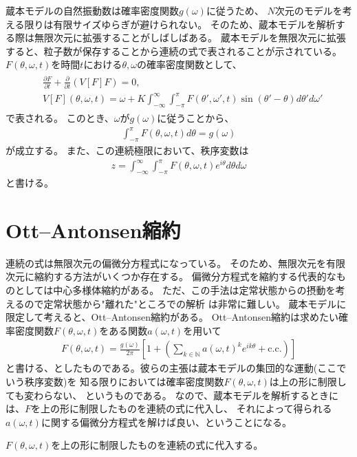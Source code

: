 \documentclass{jsarticle}
\begin{document}
蔵本モデルの自然振動数は確率密度関数$g(\omega)$に従うため、
$N$次元のモデルを考える限りは有限サイズゆらぎが避けられない。
そのため、蔵本モデルを解析する際は無限次元に拡張することがしばしばある。
蔵本モデルを無限次元に拡張すると、粒子数が保存することから連続の式で表されることが示されている。
$F(\theta,\omega,t)$を時間$t$における$\theta,\omega$の確率密度関数として、
\begin{align}
\begin{split}
&\frac{\partial F}{\partial t}+\frac{\partial}{\partial t}(V[F]F)=0,\\
&V[F](\theta,\omega,t)=\omega+K\int_{-\infty}^{\infty}\int_{-\pi}^{\pi} F(\theta',\omega',t)\sin(\theta'-\theta)d\theta'd\omega'
\end{split}
\end{align}
で表される。
このとき、$\omega$が$g(\omega)$に従うことから、
\begin{align}
\int_{-\pi}^{\pi}F(\theta,\omega,t)d\theta=g(\omega)
\end{align}
が成立する。
また、この連続極限において、秩序変数は
\begin{align}
z=\int_{-\infty}^{\infty}\int_{-\pi}^{\pi} F(\theta,\omega,t)e^{i\theta}d\theta d\omega
\end{align}
と書ける。

\section{Ott--Antonsen縮約}
連続の式は無限次元の偏微分方程式になっている。
そのため、無限次元を有限次元に縮約する方法がいくつか存在する。
偏微分方程式を縮約する代表的なものとしては中心多様体縮約がある。
ただ、この手法は定常状態からの摂動を考えるので定常状態から"離れた"ところでの解析
は非常に難しい。
蔵本モデルに限定して考えると、Ott--Antonsen縮約がある。
Ott--Antonsen縮約は求めたい確率密度関数$F(\theta,\omega,t)$をある関数$a(\omega,t)$を用いて
\begin{align}
F(\theta,\omega,t)=\frac{g(\omega)}{2\pi}\left[1+\left(\sum_{k\in\mathbb{N}}a(\omega,t)^{k}e^{ik\theta}+\mathrm{c.c.}\right)\right]
\end{align}
と書ける、としたものである。彼らの主張は蔵本モデルの集団的な運動(ここでいう秩序変数)を
知る限りにおいては確率密度関数$F(\theta,\omega,t)$は上の形に制限しても変わらない、
というものである。
なので、蔵本モデルを解析するときには、$F$を上の形に制限したものを連続の式に代入し、
それによって得られる$a(\omega,t)$に関する偏微分方程式を解けば良い、ということになる。

$F(\theta,\omega,t)$を上の形に制限したものを連続の式に代入する。



\end{document}
